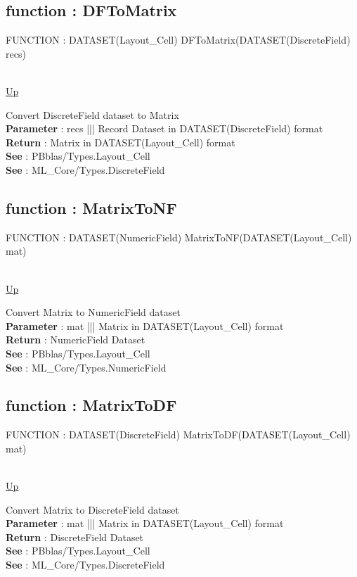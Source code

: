 \subsection*{function : DFToMatrix}
\hypertarget{ecldoc:pbblas.converted.dftomatrix}{FUNCTION : DATASET(Layout\_Cell) DFToMatrix(DATASET(DiscreteField) recs)} \\
\hyperlink{ecldoc:PBblas.Converted}{Up} \\
\par
Convert DiscreteField dataset to Matrix \\
\textbf{Parameter} : recs ||| Record Dataset in DATASET(DiscreteField) format \\
\textbf{Return} : Matrix in DATASET(Layout\_Cell) format \\
\textbf{See} : PBblas/Types.Layout\_Cell \\
\textbf{See} : ML\_Core/Types.DiscreteField \\
\subsection*{function : MatrixToNF}
\hypertarget{ecldoc:pbblas.converted.matrixtonf}{FUNCTION : DATASET(NumericField) MatrixToNF(DATASET(Layout\_Cell) mat)} \\
\hyperlink{ecldoc:PBblas.Converted}{Up} \\
\par
Convert Matrix to NumericField dataset \\
\textbf{Parameter} : mat ||| Matrix in DATASET(Layout\_Cell) format \\
\textbf{Return} : NumericField Dataset \\
\textbf{See} : PBblas/Types.Layout\_Cell \\
\textbf{See} : ML\_Core/Types.NumericField \\
\subsection*{function : MatrixToDF}
\hypertarget{ecldoc:pbblas.converted.matrixtodf}{FUNCTION : DATASET(DiscreteField) MatrixToDF(DATASET(Layout\_Cell) mat)} \\
\hyperlink{ecldoc:PBblas.Converted}{Up} \\
\par
Convert Matrix to DiscreteField dataset \\
\textbf{Parameter} : mat ||| Matrix in DATASET(Layout\_Cell) format \\
\textbf{Return} : DiscreteField Dataset \\
\textbf{See} : PBblas/Types.Layout\_Cell \\
\textbf{See} : ML\_Core/Types.DiscreteField \\

